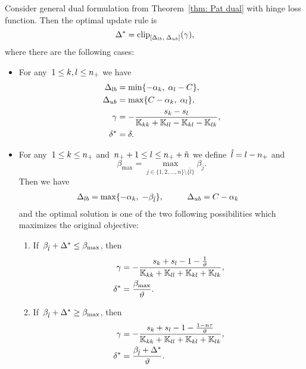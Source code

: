 \begin{theorem}\label{thm:Update rule PatMat with hinge loss}
  Consider general dual formulation from Theorem~\ref{thm: Pat dual} with hinge loss function. Then the optimal update rule is
  \begin{equation*}
      \Delta^{*} = \clip{\Delta_{lb}}{\Delta_{ub}}{\gamma},
  \end{equation*}
  where there are the following cases:
  \begin{itemize}
    \item For any~$1\le k, l \le n_{+}$ we have
    \begin{align*}
      \Delta_{lb} & = \min\{- \alpha_k,\; \alpha_l - C\}, \\
      \Delta_{ub} & = \max\{C - \alpha_k,\; \alpha_l\}, \\
      \gamma      & = -\frac{s_k - s_l}{\mathbb{K}_{kk} + \mathbb{K}_{ll} - \mathbb{K}_{kl} - \mathbb{K}_{lk}}, \\
      \delta^{*}  & = \delta.
    \end{align*}

    \item For any~$1 \le k \le n_{+}$ and~$n_{+} + 1 \le l \le n_{+} + \tilde{n}$ we define~$\hat{l} = l - n_{+}$ and
    \begin{equation*}
      \beta_{\max}
        = \max_{j \in \{1, 2, \ldots, n\} \setminus \{\hat{l}\}} \beta_j.
    \end{equation*}
    Then we have
    \begin{alignat*}{2}
      \Delta_{lb} & = \max\{- \alpha_k,\; -\beta_{\hat{l}} \}, & \qquad
      \Delta_{ub} & = C - \alpha_k
    \end{alignat*}
    and the optimal solution is one of the two following possibilities which maximizes the original objective:
    \begin{enumerate}
      \item If~$\beta_{\hat{l}} + \Delta^{*} \leq \beta_{\max}$, then
      \begin{align*}
        \gamma & = -\frac{s_k + s_l - 1 - \frac{1}{\vartheta}}{\mathbb{K}_{kk} + \mathbb{K}_{ll} + \mathbb{K}_{kl} + \mathbb{K}_{lk}}, \\
        \delta^{*} & = \frac{\beta_{\max}}{\vartheta}.
      \end{align*}
      \item If~$\beta_{\hat{l}} + \Delta^{*} \ge \beta_{\max}$, then
      \begin{align*}
        \gamma & = -\frac{s_k + s_l - 1 - \frac{1 - n\tau}{\vartheta}}{\mathbb{K}_{kk} + \mathbb{K}_{ll} + \mathbb{K}_{kl} + \mathbb{K}_{lk}}, \\
        \delta^{*} & = \frac{\beta_{\hat{l}} + \Delta^{*}}{\vartheta}.
      \end{align*}
    \end{enumerate}


\end{itemize}
\end{theorem}
